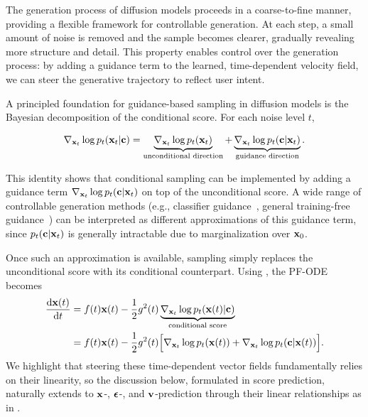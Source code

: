 The generation process of diffusion models proceeds in a coarse-to-fine manner, providing a flexible framework for controllable generation. At each step, a small amount of noise is removed and the sample becomes clearer, gradually revealing more structure and detail. This property enables control over the generation process: by adding a guidance term to the learned, time-dependent velocity field, we can steer the generative trajectory to reflect user intent.

A principled foundation for guidance-based sampling in diffusion models is the Bayesian decomposition of the conditional score. For each noise level $t$,
\begin{mdframed}
\begin{align}
\nabla_{{\mathbf{x}}_t}\log p_t({\mathbf{x}}_t |{\mathbf{c}})
=
\underbrace{\nabla_{{\mathbf{x}}_t}\log p_t({\mathbf{x}}_t)}_{\text{unconditional direction}}
+
\underbrace{\nabla_{{\mathbf{x}}_t}\log p_t({\mathbf{c}} |{\mathbf{x}}_t)}_{\text{guidance direction}}.
\label{eq:guidance_bayes}
\end{align}
\end{mdframed}
This identity shows that conditional sampling can be implemented by adding a guidance term $\nabla_{{\mathbf{x}}_t}\log p_t({\mathbf{c}} |{\mathbf{x}}_t)$ on top of the unconditional score. A wide range of controllable generation methods (e.g., classifier guidance~\citep{dhariwal2021diffusion}, general training-free guidance~\citep{ye2024tfg}) can be interpreted as different approximations of this guidance term, since $p_t({\mathbf{c}} |{\mathbf{x}}_t)$ is generally intractable due to marginalization over ${\mathbf{x}}_0$.

Once such an approximation is available, sampling simply replaces the unconditional score with its conditional counterpart. Using , the PF-ODE becomes
\begin{align}\label{eq:condition_prob_ode}
\begin{aligned}
    \frac{\mathop{}\!\mathrm{d} \mathbf{x}(t)}{\mathop{}\!\mathrm{d} t} &= f(t)\mathbf{x}(t) - \frac{1}{2} g^2(t) \underbrace{\nabla_{{\mathbf{x}}_t} \log p_t({\mathbf{x}}(t) |{\mathbf{c}})}_{\text{conditional score}} \\
    &= f(t)\mathbf{x}(t) - \frac{1}{2} g^2(t) \Big[ \nabla_{{\mathbf{x}}_t} \log p_t({\mathbf{x}}(t)) + \nabla_{{\mathbf{x}}_t} \log p_t({\mathbf{c}} |{\mathbf{x}}(t)) \Big].
\end{aligned}
\end{align}
We highlight that steering these time-dependent vector fields fundamentally relies on their linearity, so the discussion below, formulated in score prediction, naturally extends to ${\mathbf{x}}$-, ${\bm{\epsilon}}$-, and ${\mathbf{v}}$-prediction through their linear relationships as in .

